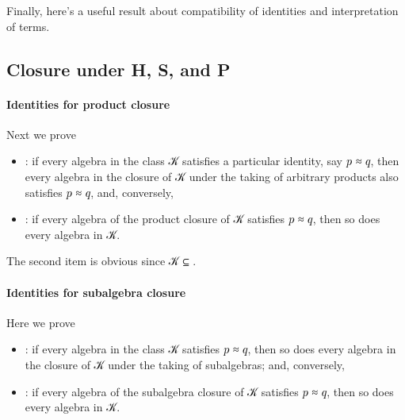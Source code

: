 \documentclass[a4paper,USenglish,cleveref,autoref,thm-restate]{lipics-v2019}
\begin{document}
Finally, here's a useful result about compatibility of identities and interpretation of terms.
\begin{code}\end{code}



\subsection{Closure under H, S, and P}\label{sec:closure-under-hsp}
\paragraph*{Identities for product closure}
Next we prove
\begin{itemize}
\item {}: if every algebra in the class \AB 𝒦 satisfies a particular identity, say 𝑝 ≈ 𝑞, then every algebra in the closure  of \AB 𝒦 under the taking of arbitrary products also satisfies 𝑝 ≈ 𝑞, and, conversely,
\item {}: if every algebra of the product closure  of \AB 𝒦 satisfies 𝑝 ≈ 𝑞, then so does every algebra in \AB 𝒦.
\end{itemize}
The second item is obvious since \AB 𝒦 ⊆ .
\begin{code}\end{code}

\paragraph*{Identities for subalgebra closure}
Here we prove
\begin{itemize}
\item {}: if every algebra in the class \AB 𝒦 satisfies 𝑝 ≈ 𝑞, then so does every algebra in the closure  of \AB 𝒦 under the taking of subalgebras; and, conversely,
\item {}: if every algebra of the subalgebra closure  of \AB 𝒦 satisfies 𝑝 ≈ 𝑞, then so does every algebra in \AB 𝒦.
\end{itemize}
\begin{code}\end{code}
\end{document}
